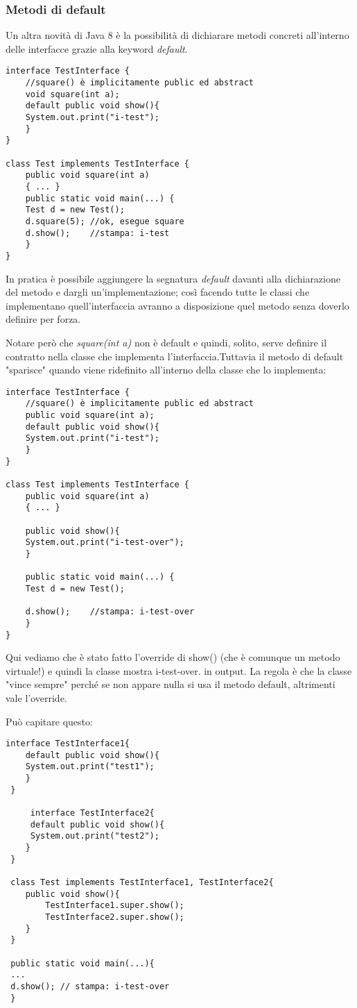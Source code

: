 \subsubsection{Metodi di default}
Un altra novità di Java 8 è la possibilità di dichiarare metodi concreti all'interno delle interfacce grazie alla keyword \textit{default}.
\begin{lstlisting}
interface TestInterface { 
	//square() è implicitamente public ed abstract
	void square(int a);
	default public void show(){
	System.out.print("i-test");
	} 
}

class Test implements TestInterface {
	public void square(int a) 
	{ ... }
	public static void main(...) {
	Test d = new Test();
	d.square(5); //ok, esegue square
	d.show();    //stampa: i-test
	}
}
\end{lstlisting}
In pratica è possibile aggiungere la segnatura \textit{default} davanti alla dichiarazione del metodo e dargli un'implementazione; così facendo tutte le classi che implementano quell'interfaccia avranno a disposizione quel metodo senza doverlo definire per forza.

Notare però che \textit{square(int a)} non è default e quindi, solito, serve definire il contratto nella classe che implementa l'interfaccia.Tuttavia il metodo di default "sparisce" quando viene ridefinito all’interno della classe che lo implementa:
\begin{lstlisting}
interface TestInterface { 
	//square() è implicitamente public ed abstract
	public void square(int a);
	default public void show(){
	System.out.print("i-test");
	} 
}

class Test implements TestInterface {
	public void square(int a) 
	{ ... }

	public void show(){
	System.out.print("i-test-over");
	}

	public static void main(...) {
	Test d = new Test();

	d.show();    //stampa: i-test-over
	}
}
\end{lstlisting}
Qui vediamo che è stato fatto l'override di show() (che è comunque un metodo virtuale!) e quindi la classe mostra i-test-over. in output. La regola è che la classe "vince sempre" perché se non appare nulla si usa il metodo default, altrimenti vale l'override.

Può capitare questo:
\begin{lstlisting}
interface TestInterface1{
 	default public void show(){
 	System.out.print("test1");
 	} 
 }

	 interface TestInterface2{ 
	 default public void show(){
	 System.out.print("test2");
 	} 
 }

 class Test implements TestInterface1, TestInterface2{
 	public void show(){
 		TestInterface1.super.show();
 		TestInterface2.super.show();
 	}
 }

 public static void main(...){
 ...
 d.show(); // stampa: i-test-over
 }
\end{lstlisting}

